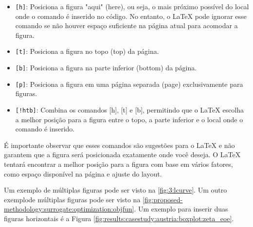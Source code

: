 		\begin{itemize}
			\item \verb|[h]|: Posiciona a figura "aqui" (here), ou seja, o mais próximo possível do local onde o comando é inserido no código. No entanto, o LaTeX pode ignorar esse comando se não houver espaço suficiente na página atual para acomodar a figura.
			\item \verb|[t]|: Posiciona a figura no topo (top) da página.
			\item \verb|[b]|: Posiciona a figura na parte inferior (bottom) da página.
			\item \verb|[p]|: Posiciona a figura em uma página separada (page) exclusivamente para figuras.
			\item \verb|[!htb]|: Combina os comandos [h], [t] e [b], permitindo que o LaTeX escolha a melhor posição para a figura entre o topo, a parte inferior e o local onde o comando é inserido.
		\end{itemize}

		É importante observar que esses comandos são sugestões para o LaTeX e não garantem que a figura será posicionada exatamente onde você deseja. O LaTeX tentará encontrar a melhor posição para a figura com base em vários fatores, como espaço disponível na página e ajuste do layout.

		Um exemplo de múltiplas figuras pode ser visto na \autoref{fig:3:lcurve}. Um outro exemplode múltiplas figuras pode ser visto na \autoref{fig:proposed-methodology:surrogate:optimization:objfun}. Um exemplo para inserir duas figuras horizontais é a Figura \ref{fig:results:casestudy:austria:boxplot:zeta_eoe}.

